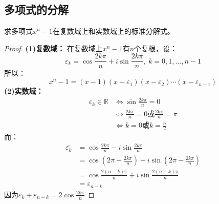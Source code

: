 \subsection{多项式的分解}
\begin{theorem}
	求多项式$x^n-1$在复数域上和实数域上的标准分解式。
\end{theorem}
\begin{proof}
	\textbf{(1)复数域：}
	在复数域上$x^n-1$有$n$个复根，设：
	\begin{equation*}
		\varepsilon_k=\cos\frac{2k\pi}{n}+i\sin\frac{2k\pi}{n},\;k=0,1,\dots,n-1
	\end{equation*}
	所以：
	\begin{equation*}
		x^n-1=(x-1)(x-\varepsilon_1)(x-\varepsilon_2)\cdots(x-\varepsilon_{n-1})
	\end{equation*}	
	\textbf{(2)实数域：}
	\begin{align*}
		\varepsilon_k\in\mathbb{R}
		&\Leftrightarrow\sin\frac{2k\pi}{n}=0 \\
		&\Leftrightarrow\frac{2k\pi}{n}=0\text{或}\frac{2k\pi}{n}=\pi \\
		&\Leftrightarrow k=0\text{或}k=\frac{n}{2} 
	\end{align*}
	而：
	\begin{align*}
		\overline{\varepsilon_k}
		&=\cos\frac{2k\pi}{n}-i\sin\frac{2k\pi}{n} \\
		&=\cos\left(2\pi-\frac{2k\pi}{n}\right)+i\sin\left(2\pi-\frac{2k\pi}{n}\right) \\
		&=\cos\frac{2(n-k)\pi}{n}+i\sin\frac{2(n-k)\pi}{n} \\
		&=\varepsilon_{n-k}
	\end{align*}
	因为$\varepsilon_k+\varepsilon_{n-k}=2\cos\frac{2k\pi}{n}$
\end{proof}